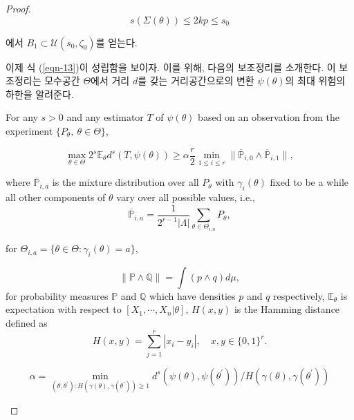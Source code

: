 \begin{proof}
\begin{equation*}
s(\Sigma(\theta)) \leq 2 kp \leq s_0
\end{equation*}

에서 $B_1 \subset \mathcal{U}(s_0, \zeta_0)$를 얻는다. 

이제 식 (\ref{eqn-13})이 성립함을 보이자. 이를 위해, 다음의 보조정리를 소개한다. 이 보조정리는 모수공간 $\Theta$에서 거리 $d$를 갖는 거리공간으로의 변환 $\psi(\theta)$의 최대 위험의 하한을 알려준다.

\begin{lemma}

For any $s > 0$ and any estimator $T$ of $\psi(\theta)$ based on an observation from the experiment $\{ P_\theta,~\theta \in \Theta \}$,

\begin{equation*}
\max_{\theta \in \Theta} 2^s \mathbb{E}_\theta d^s(T, \psi(\theta)) \geq  \alpha \frac{r}{2} \min _ {1 \leq i \leq r} \lVert \overline{\mathbb{P}} _ {i, 0} \wedge \overline{\mathbb{P}} _ {i, 1} \rVert,
\end{equation*}

where $\overline{\mathbb{P}} _ {i, a}$ is the mixture distribution over all $P_\theta$ with $\gamma_i(\theta)$ ﬁxed to be a while all other components of $\theta$ vary over all possible values, i.e.,
\begin{equation*}
\overline{\mathbb{P}} _ {i, a} = \frac{1}{2^{r-1} |\Lambda|} \sum_{\theta \in \Theta_{i, a}} P_\theta,
\end{equation*}

for $\Theta_{i, a} = \{ \theta \in \Theta: \gamma_i(\theta) = a \}$,

\begin{equation*}
\lVert \mathbb{P} \wedge \mathbb{Q} \rVert = \int (p \wedge q) d \mu,
\end{equation*}
for probability measures $\mathbb{P}$ and $\mathbb{Q}$ which have densities $p$ and $q$ respectively, $\mathbb{E} _ \theta$ is expectation with respect to $[X_1, \cdots, X_n | \theta]$, $H(x, y)$ is the Hamming distance defined as
$$H(x, y) = \sum_{j=1}^r |x_i - y_i|, \quad x, y \in \{ 0, 1 \}^r.$$

\begin{equation*}
\alpha = \min_{(\theta, \theta^\prime) : H(\gamma(\theta), \gamma(\theta^\prime)) \geq 1} d^s(\psi(\theta), \psi(\theta^\prime)) / H(\gamma(\theta), \gamma(\theta^\prime))
\end{equation*}


\end{lemma}
\end{proof}
